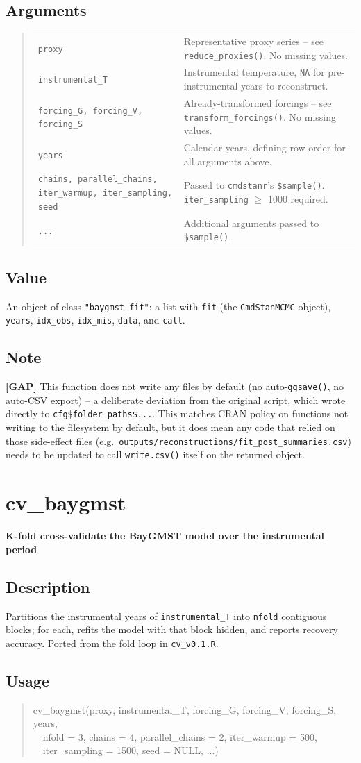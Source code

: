 \documentclass[10pt]{article}
\newcommand{\gap}[1]{\textcolor{gapred}{\textbf{[GAP]} #1}}
\newcommand{\rdtopic}[1]{\clearpage\section{#1}}
\newcommand{\rdsub}[1]{\subsection*{#1}}
\newenvironment{rdusage}{\begin{quote}\ttfamily\small}{\end{quote}}
\begin{document}
\rdsub{Arguments}
\begin{quote}
\begin{tabular}{@{}p{3.4cm}p{10.6cm}@{}}
\texttt{proxy} & Representative proxy series -- see \texttt{reduce\_proxies()}. No missing values. \\[0.3em]
\texttt{instrumental\_T} & Instrumental temperature, \texttt{NA} for pre-instrumental years to reconstruct. \\[0.3em]
\texttt{forcing\_G, forcing\_V, forcing\_S} & Already-transformed forcings -- see \texttt{transform\_forcings()}. No missing values. \\[0.3em]
\texttt{years} & Calendar years, defining row order for all arguments above. \\[0.3em]
\texttt{chains, parallel\_chains, iter\_warmup, iter\_sampling, seed} & Passed to \texttt{cmdstanr}'s \texttt{\$sample()}. \texttt{iter\_sampling} $\geq$ 1000 required. \\[0.3em]
\texttt{...} & Additional arguments passed to \texttt{\$sample()}. \\
\end{tabular}
\end{quote}

\rdsub{Value}
An object of class \texttt{"baygmst\_fit"}: a list with \texttt{fit} (the
\texttt{CmdStanMCMC} object), \texttt{years}, \texttt{idx\_obs},
\texttt{idx\_mis}, \texttt{data}, and \texttt{call}.

\rdsub{Note}
\gap{This function does not write any files by default (no auto-\texttt{ggsave()},
no auto-CSV export) -- a deliberate deviation from the original script,
which wrote directly to \texttt{cfg\$folder\_paths\$...}. This matches CRAN
policy on functions not writing to the filesystem by default, but it does
mean any code that relied on those side-effect files (e.g.\
\texttt{outputs/reconstructions/fit\_post\_summaries.csv}) needs to be
updated to call \texttt{write.csv()} itself on the returned object.}

\rdtopic{cv\_baygmst}
\textbf{K-fold cross-validate the BayGMST model over the instrumental period}

\rdsub{Description}
Partitions the instrumental years of \texttt{instrumental\_T} into
\texttt{nfold} contiguous blocks; for each, refits the model with that
block hidden, and reports recovery accuracy. Ported from the fold loop in
\texttt{cv\_v0.1.R}.

\rdsub{Usage}
\begin{rdusage}
cv\_baygmst(proxy, instrumental\_T, forcing\_G, forcing\_V, forcing\_S, years,\\
\ \ nfold = 3, chains = 4, parallel\_chains = 2, iter\_warmup = 500,\\
\ \ iter\_sampling = 1500, seed = NULL, ...)
\end{rdusage}
\end{document}
